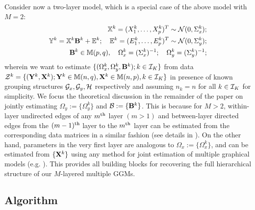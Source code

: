 Consider now a two-layer model, which is a special case of the above model with $M=2$:
%
\begin{eqnarray}
{\mathbb{X}}^k = (X^k_1, \ldots, X^k_p)^T \sim {\cal{N}} (0, \Sigma^k_{x});\\
{\mathbb{Y}}^k = {\mathbb{X}}^k {\mathbf{B}}^k + {\mathbb{E}}^k; \quad {\mathbb{E}}^k = (E^k_1, \ldots, E^k_p)^T \sim {\cal{N}} (0, \Sigma^k_{y});\\
{\mathbf{B}}^k \in {\mathbb{M}}(p,q), \quad \Omega^k_{x} = (\Sigma^k_{x})^{-1}; \quad \Omega^k_y = (\Sigma^k_{y})^{-1};
\end{eqnarray}
%
wherein we want to estimate $\{ (\Omega^k_{x}, \Omega^k_{y}, {\mathbf{B}}^k); k \in {\cal{I}}_K \}$ from data ${\cal{Z}}^k = \{ ({\mathbf{Y}}^k, {\mathbf{X}}^k); {\mathbf{Y}}^k \in {\mathbb{M}}(n,q), {\mathbf{X}}^k \in {\mathbb{M}}(n,p), k \in {\cal{I}}_K\}$ in presence of known grouping structures ${\cal{G}}_x, {\cal{G}}_y, {\cal{H}}$ respectively and assuming $n_k = n$ for all $k \in {\cal{I}}_K$ for simplicity. We focus the theoretical discussion in the remainder of the paper on jointly estimating $\Omega_{y}:= \{ \Omega_{y}^k \}$ and ${\cal{B}} := \{ {\mathbf{B}}^k \}$. This is because for $M>2$, within-layer undirected edges of any $m{\operatorname*{^{\text{th}}}}$ layer $(m>1)$ and between-layer directed edges from the $(m-1){\operatorname*{^{\text{th}}}}$ layer to the $m{\operatorname*{^{\text{th}}}}$ layer can be estimated from the corresponding data matrices in a similar fashion (see details in \citet{LinEtal16}). On the other hand, parameters in the very first layer are analogous to $\Omega_{x} := \{ \Omega_{x}^k \}$, and can be estimated from $\{ {\mathbf{X}}^k\}$ using any method for joint estimation of multiple graphical models (e.g. \citet{GuoEtal11, MaMichailidis15}). This provides all building blocks for recovering the full hierarchical structure of our $M$-layered multiple GGMs.


\subsection{Algorithm}
\label{sec:algosection}

